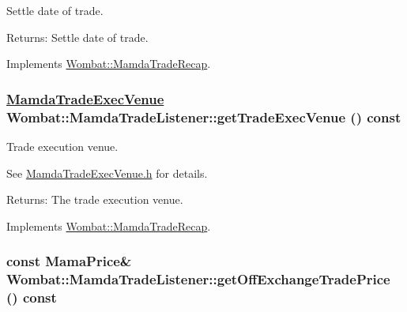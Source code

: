 Settle date of trade. 

\begin{Desc}
\item[Returns:]Settle date of trade. \end{Desc}


Implements \hyperlink{classWombat_1_1MamdaTradeRecap_80a2aabb513c40dc4d7d22173077b5db}{Wombat::Mamda\-Trade\-Recap}.\hypertarget{classWombat_1_1MamdaTradeListener_12aa826e64effedd9e64fcdc95ce8217}{
\subsubsection[getTradeExecVenue]{\setlength{\rightskip}{0pt plus 5cm}\hyperlink{namespaceWombat_daf4c098665070a9e45bf835bad3548a}{Mamda\-Trade\-Exec\-Venue} Wombat::Mamda\-Trade\-Listener::get\-Trade\-Exec\-Venue () const}}
\label{classWombat_1_1MamdaTradeListener_12aa826e64effedd9e64fcdc95ce8217}


Trade execution venue. 

See \hyperlink{MamdaTradeExecVenue_8h}{Mamda\-Trade\-Exec\-Venue.h} for details.

\begin{Desc}
\item[Returns:]The trade execution venue. \end{Desc}


Implements \hyperlink{classWombat_1_1MamdaTradeRecap_6df7435306c01b0d0828d9a524fbe0bd}{Wombat::Mamda\-Trade\-Recap}.\hypertarget{classWombat_1_1MamdaTradeListener_71f698fe02f28a03082e13bc1712520c}{
\subsubsection[getOffExchangeTradePrice]{\setlength{\rightskip}{0pt plus 5cm}const Mama\-Price\& Wombat::Mamda\-Trade\-Listener::get\-Off\-Exchange\-Trade\-Price () const}}
\label{classWombat_1_1MamdaTradeListener_71f698fe02f28a03082e13bc1712520c}


